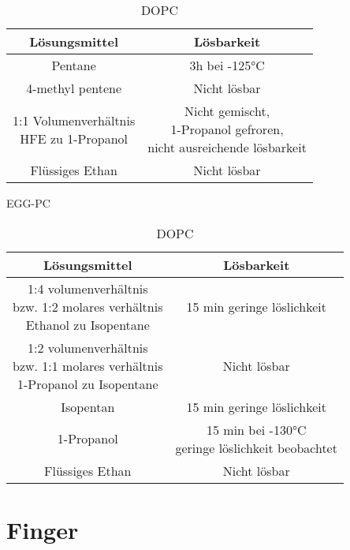 \begin{table}[h]
	\begin{subtable}{\linewidth}
		\centering
		\begin{tabular}{|c|c|}
		\hline
		Lösungsmittel & Lösbarkeit \\
		\hline
		Pentane & 3h bei -125°C \\
		\hline
		4-methyl pentene & Nicht lösbar \\
		\hline
		\makecell{1:1 Volumenverhältnis\\ HFE zu 1-Propanol} & \makecell{Nicht gemischt,\\ 1-Propanol gefroren,\\ nicht ausreichende lösbarkeit}\\
		\hline
		Flüssiges Ethan & Nicht lösbar \\
		\hline
		\end{tabular}
		\caption{EGG-PC}
		\label{table:EGG-PCCryoloeslichkeit}
	\end{subtable}
	\begin{subtable}{\linewidth}
		\centering
		\begin{tabular}{|c|c|}
		\hline
		Lösungsmittel & Lösbarkeit \\
		\hline
		\makecell{1:4 volumenverhältnis\\ bzw. 1:2 molares verhältnis\\ Ethanol zu Isopentane} & 15 min geringe löslichkeit\\
		\hline
		\makecell{1:2 volumenverhältnis\\ bzw. 1:1 molares verhältnis\\ 1-Propanol zu Isopentane} & Nicht lösbar \\
		\hline
		Isopentan & 15 min geringe löslichkeit\\
		\hline
		1-Propanol & \makecell{15 min bei -130°C\\ geringe löslichkeit beobachtet}\\
		\hline
		Flüssiges Ethan & Nicht lösbar \\
		\hline
		\end{tabular}
		\caption{DOPC}
		\label{table:DOPCCryoloeslichkeit}
	\end{subtable}
	\label{table:Cryoloeslichkeit}
\end{table}

\section{Finger}

